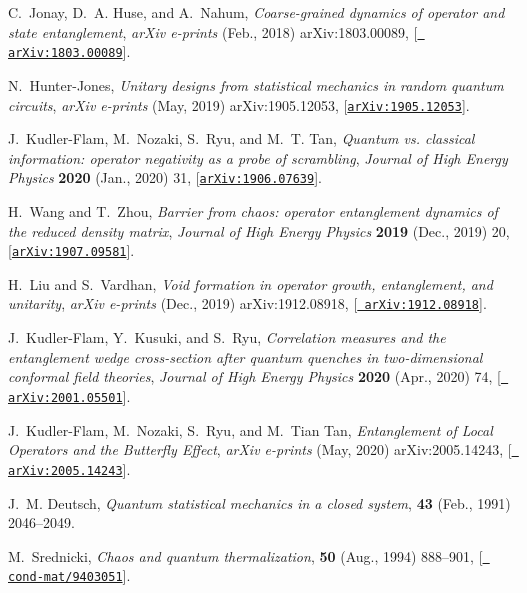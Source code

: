 \documentclass[a4paper,11pt]{article}
\newcommand{\pra}{\text{Physical Review A}}
\newcommand{\pre}{\text{Physical Review E}}
\begin{document}
\begin{thebibliography}{100}
C.~{Jonay}, D.~A. {Huse}, and A.~{Nahum}, {\it {Coarse-grained dynamics of
  operator and state entanglement}},  {\em arXiv e-prints} (Feb., 2018)
  arXiv:1803.00089, [\href{http://arxiv.org/abs/1803.00089}{{\tt
  arXiv:1803.00089}}].

N.~{Hunter-Jones}, {\it {Unitary designs from statistical mechanics in random
  quantum circuits}},  {\em arXiv e-prints} (May, 2019) arXiv:1905.12053,
  [\href{http://arxiv.org/abs/1905.12053}{{\tt arXiv:1905.12053}}].

J.~{Kudler-Flam}, M.~{Nozaki}, S.~{Ryu}, and M.~T. {Tan}, {\it {Quantum vs.
  classical information: operator negativity as a probe of scrambling}},  {\em
  Journal of High Energy Physics} {\bf 2020} (Jan., 2020) 31,
  [\href{http://arxiv.org/abs/1906.07639}{{\tt arXiv:1906.07639}}].

H.~{Wang} and T.~{Zhou}, {\it {Barrier from chaos: operator entanglement
  dynamics of the reduced density matrix}},  {\em Journal of High Energy
  Physics} {\bf 2019} (Dec., 2019) 20,
  [\href{http://arxiv.org/abs/1907.09581}{{\tt arXiv:1907.09581}}].

H.~{Liu} and S.~{Vardhan}, {\it {Void formation in operator growth,
  entanglement, and unitarity}},  {\em arXiv e-prints} (Dec., 2019)
  arXiv:1912.08918, [\href{http://arxiv.org/abs/1912.08918}{{\tt
  arXiv:1912.08918}}].

J.~{Kudler-Flam}, Y.~{Kusuki}, and S.~{Ryu}, {\it {Correlation measures and the
  entanglement wedge cross-section after quantum quenches in two-dimensional
  conformal field theories}},  {\em Journal of High Energy Physics} {\bf 2020}
  (Apr., 2020) 74, [\href{http://arxiv.org/abs/2001.05501}{{\tt
  arXiv:2001.05501}}].

J.~{Kudler-Flam}, M.~{Nozaki}, S.~{Ryu}, and M.~{Tian Tan}, {\it {Entanglement
  of Local Operators and the Butterfly Effect}},  {\em arXiv e-prints} (May,
  2020) arXiv:2005.14243, [\href{http://arxiv.org/abs/2005.14243}{{\tt
  arXiv:2005.14243}}].

J.~M. {Deutsch}, {\it {Quantum statistical mechanics in a closed system}},
  {\em \pra} {\bf 43} (Feb., 1991) 2046--2049.

M.~{Srednicki}, {\it {Chaos and quantum thermalization}},  {\em \pre} {\bf 50}
  (Aug., 1994) 888--901, [\href{http://arxiv.org/abs/cond-mat/9403051}{{\tt
  cond-mat/9403051}}].


\end{thebibliography}
\end{document}
